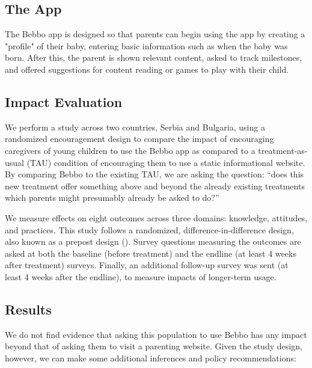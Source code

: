 \documentclass{article}
\begin{document}
\subsection*{The App}

The Bebbo app is designed so that parents can begin using the app by creating a "profile" of their baby, entering basic information such as when the baby was born. After this, the parent is shown relevant content, asked to track milestones, and offered suggestions for content reading or games to play with their child.

\subsection*{Impact Evaluation}

We perform a study across two countries, Serbia and Bulgaria, using a randomized encouragement design to compare the impact of encouraging caregivers of young children to use the Bebbo app as compared to a treatment-as-usual (TAU) condition of encouraging them to use a static informational website. By comparing Bebbo to the existing TAU, we are asking the question: “does this new treatment offer something above and beyond the already existing treatments which parents might presumably already be asked to do?”

We measure effects on eight outcomes across three domains: knowledge, attitudes, and practices. This study follows a randomized, difference-in-difference design, also known as a prepost design (\cite{Clifford2021}). Survey questions measuring the outcomes are asked at both the baseline (before treatment) and the endline (at least 4 weeks after treatment) surveys. Finally, an additional follow-up survey was sent (at least 4 weeks after the endline), to measure impacts of longer-term usage.

\subsection*{Results}

We do not find evidence that asking this population to use Bebbo has any impact beyond that of asking them to visit a parenting website. Given the study design, however, we can make some additional inferences and policy recommendations:
\end{document}
